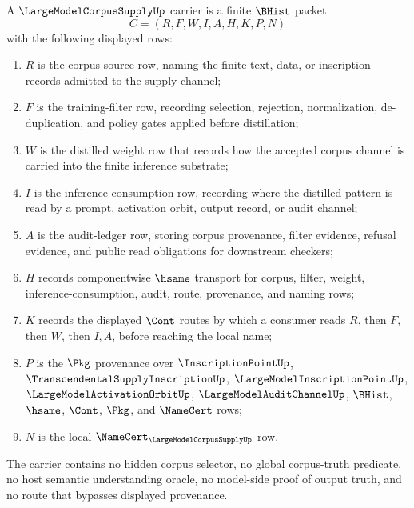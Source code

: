 \begin{definition}
\label{def:large-model-corpus-supply-carrier}
A $\LargeModelCorpusSupplyUp$ carrier is a finite $\BHist$ packet
$$
C=(R,F,W,I,A,H,K,P,N)
$$
with the following displayed rows:
\begin{enumerate}
\item $R$ is the corpus-source row, naming the finite text, data, or inscription records admitted to the supply channel;
\item $F$ is the training-filter row, recording selection, rejection, normalization, de-duplication, and policy gates applied before distillation;
\item $W$ is the distilled weight row that records how the accepted corpus channel is carried into the finite inference substrate;
\item $I$ is the inference-consumption row, recording where the distilled pattern is read by a prompt, activation orbit, output record, or audit channel;
\item $A$ is the audit-ledger row, storing corpus provenance, filter evidence, refusal evidence, and public read obligations for downstream checkers;
\item $H$ records componentwise $\hsame$ transport for corpus, filter, weight, inference-consumption, audit, route, provenance, and naming rows;
\item $K$ records the displayed $\Cont$ routes by which a consumer reads $R$, then $F$, then $W$, then $I,A$, before reaching the local name;
\item $P$ is the $\Pkg$ provenance over $\InscriptionPointUp$, $\TranscendentalSupplyInscriptionUp$, $\LargeModelInscriptionPointUp$, $\LargeModelActivationOrbitUp$, $\LargeModelAuditChannelUp$, $\BHist$, $\hsame$, $\Cont$, $\Pkg$, and $\NameCert$ rows;
\item $N$ is the local $\NameCert_{\LargeModelCorpusSupplyUp}$ row.
\end{enumerate}
The carrier contains no hidden corpus selector, no global corpus-truth predicate, no host semantic understanding oracle, no model-side proof of output truth, and no route that bypasses displayed provenance.
\end{definition}

